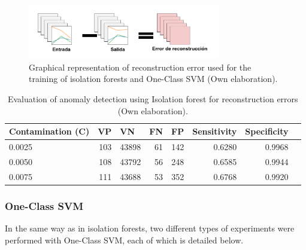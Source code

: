 \begin{itemize}
\begin{figure}[H]
        \centering
            \includegraphics[width=0.75\textwidth, frame]{imagenes/Cap5/error}
        \caption{Graphical representation of reconstruction error used for the training of isolation forests and One-Class SVM (Own elaboration).}
		\label{fig:error}
\end{figure}

\begin{table}[H]
\centering
\begin{center}
\begin{tabular}{|l|r|r|r|r|r|r|r|}
\hline
\textbf{Contamination (C)} & \multicolumn{1}{l|}{\textbf{VP}} & \multicolumn{1}{l|}{\textbf{VN}}& \multicolumn{1}{l|}{\textbf{FN}}& \multicolumn{1}{l|}{\textbf{FP}} & \multicolumn{1}{l|}{\textbf{Sensitivity}} & \multicolumn{1}{l|}{\textbf{Specificity}} \\ \hline
0.0025 & \cellcolor[HTML]{AADD99} 103 & \cellcolor[HTML]{AADD99} 43898 & \cellcolor[HTML]{FFCE93} 61 & \cellcolor[HTML]{FFCE93} 142 & 0.6280 & 0.9968 \\ \hline
0.0050 & \cellcolor[HTML]{AADD99} 108 & \cellcolor[HTML]{AADD99} 43792 & \cellcolor[HTML]{FFCE93} 56 & \cellcolor[HTML]{FFCE93} 248 & 0.6585 & 0.9944 \\ \hline
0.0075 & \cellcolor[HTML]{AADD99} 111 & \cellcolor[HTML]{AADD99} 43688 & \cellcolor[HTML]{FFCE93} 53 & \cellcolor[HTML]{FFCE93} 352 & 0.6768 & 0.9920 \\ \hline
\end{tabular}
\end{center}
\caption{Evaluation of anomaly detection using Isolation forest for reconstruction errors (Own elaboration).}
\label{table:evaluacion_IF_errores_reconstruccion}
\end{table}
\end{itemize}

\subsubsection{One-Class SVM}

In the same way as in isolation forests, two different types of experiments were performed with One-Class SVM, each of which is detailed below.

